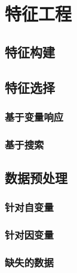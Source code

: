 \chapter{特征工程} %
\label{cha:特征工程}

\section{特征构建} %
\label{sec:特征构建}


\section{特征选择} %
\label{sec:特征选择}
\subsection{基于变量响应} %
\label{sub:基于变量响应}

\subsection{基于搜索} %
\label{sub:基于搜索}



\section{数据预处理} %
\label{sec:数据预处理}
\subsection{针对自变量} %
\label{sub:针对自变量}

\subsection{针对因变量} %
\label{sub:针对因变量}


\subsection{缺失的数据} %
\label{sub:缺失的数据}







